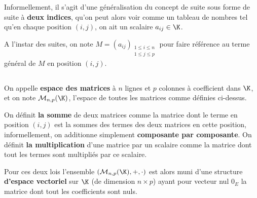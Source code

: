 Informellement, il s'agit d'une généralisation du concept de suite sous forme de suite à \textbf{deux indices}, qu'on peut alors voir comme un tableau de nombres tel qu'en chaque position \((i, j)\), on ait un scalaire \(a_{ij} \in \K\).\< 

A l'instar des suites, on note \(M = (a_{ij})_{\substack{1 \leq i \leq n\\1 \leq j \leq p}}\) pour faire référence au terme général de \(M\) en position \((i,j)\).

\subsection*{}

On appelle \textbf{espace des matrices} à \(n\) lignes et \(p\) colonnes à coefficient dans \(\K\), et on note \(\mathcal{M}_{n, p}(\K)\), l'espace de toutes les matrices comme définies ci-dessus.\<

On définit \textbf{la somme} de deux matrices comme la matrice dont le terme en position \((i, j)\) est la sommes des termes des deux matrices en cette position, informellement, on additionne simplement \textbf{composante par composante}.\+
On définit \textbf{la multiplication} d'une matrice par un scalaire comme la matrice dont tout les termes sont multipliés par ce scalaire.\<

Pour ces deux lois l'ensemble \((\mathcal{M}_{n, p}(\K), +, \cdot)\) est alors muni d'une structure \textbf{d'espace vectoriel} sur \(\K\) (de dimension \(n \times p\)) ayant pour vecteur nul \(0_E\) la matrice dont tout les coefficients sont nuls.

\subsection*{}

